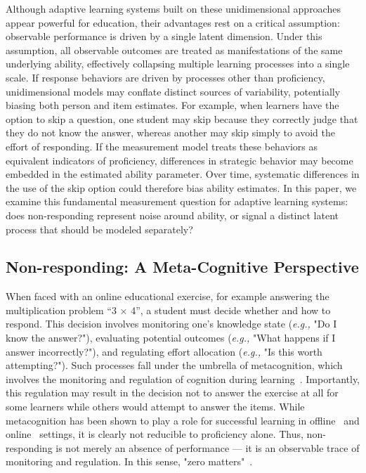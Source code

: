 \documentclass[11pt]{article}
\begin{document}
Although adaptive learning systems built on these unidimensional approaches appear powerful for education, their advantages rest on a critical assumption: observable performance is driven by a single latent dimension. Under this assumption, all observable outcomes are treated as manifestations of the same underlying ability, effectively collapsing multiple learning processes into a single scale. If response behaviors are driven by processes other than proficiency, unidimensional models may conflate distinct sources of variability, potentially biasing both person and item estimates. For example, when learners have the option to skip a question, one student may skip because they correctly judge that they do not know the answer, whereas another may skip simply to avoid the effort of responding. If the measurement model treats these behaviors as equivalent indicators of proficiency, differences in strategic behavior may become embedded in the estimated ability parameter. Over time, systematic differences in the use of the skip option could therefore bias ability estimates. In this paper, we examine this fundamental measurement question for adaptive learning systems: does non-responding represent noise around ability, or signal a distinct latent process that should be modeled separately? 

\subsection{Non-responding: A Meta-Cognitive Perspective} %
When faced with an online educational exercise, for example answering the multiplication problem ``3 $\times$ 4'', a student must decide whether and how to respond. This decision involves monitoring one's knowledge state (\textit{e.g.,} "Do I know the answer?"), evaluating potential outcomes (\textit{e.g.,} "What happens if I answer incorrectly?"), and regulating effort allocation (\textit{e.g.,} "Is this worth attempting?"). Such processes fall under the umbrella of metacognition, which involves the monitoring and regulation of cognition during learning~\parencite{winne2017cognition}. Importantly, this regulation may result in the decision not to answer the exercise at all for some learners while others would attempt to answer the items. While metacognition has been shown to play a role for successful learning in offline~\parencite{rabinowitz2017nteraction, fleur2021metacognition, colantonio2024predicting} and online~\parencite{zhao2020time, kim2009not, fidan2024emotions, shields2024active} settings, it is clearly not reducible to proficiency alone. Thus, non-responding is not merely an absence of performance --- it is an observable trace of monitoring and regulation. In this sense, "zero matters"~\parencite[p.~2]{van2025statistical}. 
\end{document}

